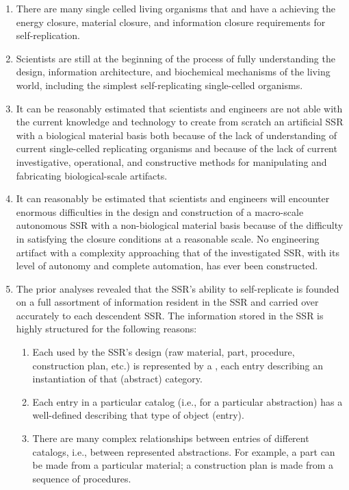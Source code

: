 \begin{enumerate}
\item There are many single celled living organisms that
 and have a  achieving the energy closure, material
closure, and information closure requirements for self-replication.
\item Scientists are still at the beginning of the process of
fully understanding the design, information architecture,
and biochemical mechanisms of the living world, including
the simplest self-replicating single-celled organisms.  
\item It can be reasonably estimated that scientists and
engineers are not able with the current knowledge and technology to
create from scratch an artificial SSR with a biological
material basis both because of the lack of understanding of current single-celled
replicating organisms and because of the lack of current investigative,
operational, and constructive methods for manipulating and fabricating 
biological-scale artifacts.
\item It can reasonably be estimated that scientists and
engineers will encounter enormous difficulties in the
design and construction of a macro-scale autonomous SSR with a
non-biological material basis because of the difficulty
in satisfying the closure conditions at a reasonable scale.  No engineering
artifact with a complexity approaching that of the investigated SSR, with
its level of autonomy and complete automation, has ever been constructed.
\item The prior analyses revealed that the SSR's
ability to self-replicate is founded on a full assortment of
 information resident in the SSR and carried over
accurately to each descendent SSR.  The information stored in the SSR
is highly structured for the following reasons:

\begin{enumerate}
\item Each  used by the SSR's design (raw
material, part, procedure, construction plan, etc.) is represented by a
, each entry describing an instantiation of
that (abstract) category.
\item Each entry in a particular catalog (i.e., for a particular
abstraction) has a well-defined  describing
that type of object (entry).
\item There are many complex relationships between entries of
different catalogs, i.e., between represented abstractions. For example,
a part can be made from a particular material; a construction plan is
made from a sequence of procedures.
\end{enumerate}
\end{enumerate}

